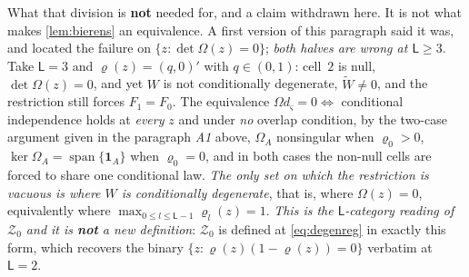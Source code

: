 What that division is \textbf{not} needed for, and a claim withdrawn here. It is not what
makes \cref{lem:bierens} an equivalence. A first version of this paragraph said it was, and located
the failure on $\{z:\det\Omega(z)=0\}$; \emph{both halves are wrong at $\mathsf L\ge3$}. Take
$\mathsf L=3$ and $\varrho(z)=(q,0)'$ with $q\in(0,1)$: cell~$2$ is null, $\det\Omega(z)=0$, and yet $W$
is not conditionally degenerate, $\widetilde W\ne0$, and the restriction still forces $F_1=F_0$. The
equivalence $\Omega d_\varsigma=0\Leftrightarrow$ conditional independence holds at \emph{every} $z$ and
under \emph{no} overlap condition, by the two-case argument given in the paragraph \emph{A1} above, 
$\Omega_A$ nonsingular when $\varrho_0>0$, $\ker\Omega_A=\operatorname{span}\{\mathbf1_A\}$ when
$\varrho_0=0$, and in both cases the non-null cells are forced to share one conditional law.
\emph{The only set on which the restriction is vacuous is where $W$ is conditionally degenerate}, that
is, where $\Omega(z)=0$, equivalently where $\max_{0\le l\le\mathsf L-1}\varrho_l(z)=1$. \emph{This is
the $\mathsf L$-category reading of $\mathcal Z_0$ and it is \textbf{not} a new definition}: $\mathcal Z_0$
is defined at \eqref{eq:degenreg} in exactly this form, which recovers the binary
$\{z:\varrho(z)(1-\varrho(z))=0\}$ verbatim at $\mathsf L=2$.
